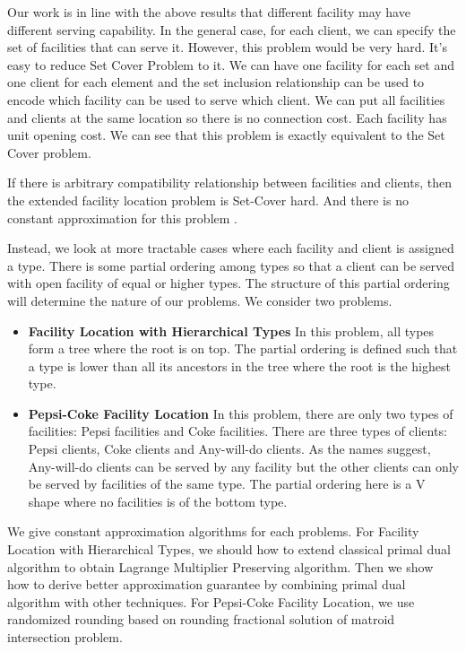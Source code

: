Our work is in line with the above results that different facility may have different serving capability. In the general case, for each client, we can specify the set of facilities that can serve it. However, this problem would be very hard. It's easy to reduce Set Cover Problem to it. We can have one facility for each set and one client for each element and the set inclusion relationship can be used to encode which facility can be used to serve which client. We can put all facilities and clients at the same location so there is no connection cost. Each facility has unit opening cost. We can see that this problem is exactly equivalent to the Set Cover problem.

\begin{thm}
If there is arbitrary compatibility relationship between facilities and clients, then the extended facility location problem is Set-Cover hard. And there is no constant approximation for this problem \cite{DBLP:journals/corr/abs-1305-1979}.
\end{thm}

Instead, we look at more tractable cases where each facility and client is assigned a type. There is some partial ordering among types so that a client can be served with open facility of equal or higher types. The structure of this partial ordering will determine the nature of our problems. We consider two problems.

\begin{itemize}
\item \textbf{Facility Location with Hierarchical Types} In this problem, all types form a tree where the root is on top. The partial ordering is defined such that a type is lower than all its ancestors in the tree where the root is the highest type.

\item \textbf{Pepsi-Coke Facility Location} In this problem, there are only two types of facilities: Pepsi facilities and Coke facilities. There are three types of clients: Pepsi clients, Coke clients and Any-will-do clients. As the names suggest, Any-will-do clients can be served by any facility but the other clients can only be served by facilities of the same type. The partial ordering here is a V shape where no facilities is of the bottom type.

\end{itemize}

We give constant approximation algorithms for each problems. For Facility Location with Hierarchical Types, we should how to extend classical primal dual algorithm to obtain Lagrange Multiplier Preserving algorithm. Then we show how to derive better approximation guarantee by combining primal dual algorithm with other techniques. For Pepsi-Coke Facility Location, we use randomized rounding based on rounding fractional solution of matroid intersection problem.